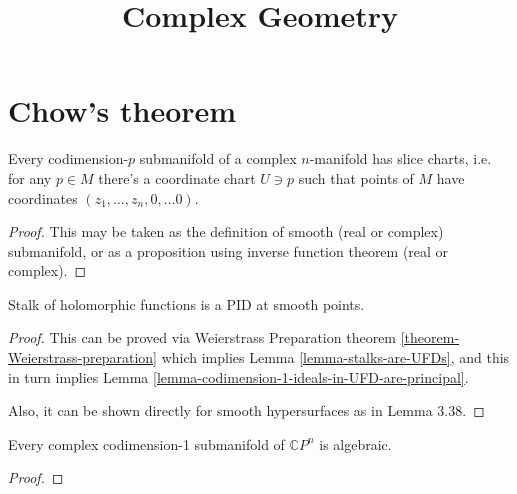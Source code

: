 



\title{Complex Geometry}
\maketitle

\label{section-phantom}

\tableofcontents

\section{Chow's theorem}
\label{section-chow-theorem}

\begin{proposition}
\label{proposition-slice-charts}
Every codimension-$p$ submanifold of a complex $n$-manifold has slice charts,
i.e. for any $p \in M$ there's a coordinate chart $U \ni p$ such that points of
$M$ have coordinates $(z_1,\ldots,z_n,0,\ldots 0)$.
\end{proposition}

\begin{proof}
This may be taken as the definition of smooth (real or complex) submanifold, or
as a proposition using inverse function theorem (real or complex).
\end{proof}

\begin{proposition}
\label{proposition-stalk-principal-smooth}
Stalk of holomorphic functions is a PID at smooth points.
\end{proposition}

\begin{proof}
This can be proved via Weierstrass Preparation theorem
\ref{theorem-Weierstrass-preparation} which implies
 Lemma \ref{lemma-stalks-are-UFDs}, and this in turn implies Lemma 
\ref{lemma-codimension-1-ideals-in-UFD-are-principal}.

Also, it can be shown directly for smooth hypersurfaces
 as in \cite{lec} Lemma 3.38.
\end{proof}

\begin{theorem}
\label{theorem-chow}
Every complex codimension-1 submanifold of $\mathbb{C}P^{n}$ is algebraic.
\end{theorem}

\begin{proof}

\end{proof}

